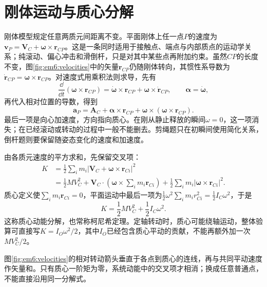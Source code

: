 \section{刚体运动与质心分解}

刚体模型规定任意两质元间距离不变。平面刚体上任一点$P$的速度为$\bm v_P=\bm V_C+\bm\omega\times\bm r_{CP}$。这是一条同时适用于接触点、端点与内部质点的运动学关系；纯滚动、偏心冲击和滑倒杆，只是对其中某些点再附加约束。虽然$CP$的长度不变，图\ref{fig:em6:velocities}中的矢量$\bm r_{CP}$仍随刚体转向，其惯性系导数为$\dot{\bm r}_{CP}=\bm\omega\times\bm r_{CP}$。对速度式用乘积法则求导，先有
\[
 \frac{\dd}{\dd t}(\bm\omega\times\bm r_{CP})
 =\dot{\bm\omega}\times\bm r_{CP}+\bm\omega\times\dot{\bm r}_{CP},
 \qquad \bm\alpha=\dot{\bm\omega},
\]
再代入相对位置的导数，得到
\[\bm a_P=\bm A_C+\bm\alpha\times\bm r_{CP}+\bm\omega\times(\bm\omega\times\bm r_{CP}).\]
最后一项是向心加速度，方向指向质心。在刚从静止释放的瞬间$\omega=0$，这一项消失；在已经滚动或转动的过程中一般不能删去。剪绳题只在初瞬间使用简化关系，倒杆题则要保留随姿态变化的速度和加速度。

由各质元速度的平方求和，先保留交叉项：
\[
 \begin{aligned}
 K&=\frac12\sum_i m_i|\bm V_C+\bm\omega\times\bm r_{Ci}|^2\\
 &=\frac12MV_C^2
 +\bm V_C\cdot\left(\bm\omega\times\sum_i m_i\bm r_{Ci}\right)
 +\frac12\sum_i m_i|\bm\omega\times\bm r_{Ci}|^2.
 \end{aligned}
\]
质心定义使$\sum_i m_i\bm r_{Ci}=0$，平面运动中最后一项为$\tfrac12\omega^2\sum_i m_ir_{Ci}^2=\tfrac12I_C\omega^2$，于是
\begin{equation}K=\frac12MV_C^2+\frac12I_C\omega^2.\label{eq:em6:kinetic}\end{equation}
这称质心动能分解，也常称柯尼希定理。定轴转动时，质心可能绕轴运动，整体验算可直接写$K=I_O\omega^2/2$，其中$I_O$已经包含质心平动的贡献，不能再额外加一次$MV_C^2/2$。


图\ref{fig:em6:velocities}的相对转动箭头垂直于各点到质心的连线，再与共同平动速度作矢量和。只有质心一阶矩为零，系统动能中的交叉项才相消；换成任意普通点，不能直接沿用同一分解式。


